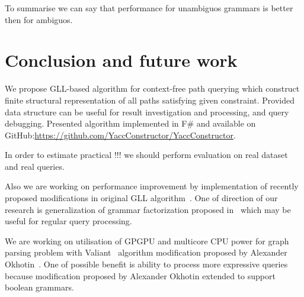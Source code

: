 \documentclass{sig-alternate} %
\begin{document}
To summarise we can say that performance for unambiguos grammars is better then for ambiguos. 

\section{Conclusion and future work}
We propose GLL-based algorithm for context-free path querying which construct finite structural representation of all paths satisfying given constraint.
Provided data structure can be useful for result investigation and processing, and query debugging.
Presented algorithm implemented in F\# and available on GitHub:\url{https://github.com/YaccConstructor/YaccConstructor}.

In order to estimate practical !!! we should perform evaluation on real dataset and real queries.

Also we are working on performance improvement by implementation of recently proposed modifications in original GLL algorithm~\cite{FGLL}.
One of direction of our research is generalization of grammar factorization proposed in~\cite{FGLL} which may be useful for regular query processing.

We are working on utilisation of GPGPU and multicore CPU power for graph parsing problem with Valiant~\cite{valiantParsingWithMatrixMultiplication} algorithm modification proposed 
by Alexander Okhotin~\cite{okhotin2014parsingWithMatrixMultiplication}.
One of possible benefit is ability to process more expressive queries because modification proposed by Alexander Okhotin extended to support boolean grammars.





\end{document}
